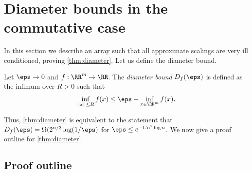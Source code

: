 



























































\setcounter{section}{2}\section{Diameter bounds in the commutative case}\label{sec:diameterComm}


In this section we describe an array such that all approximate scalings are very ill conditioned, proving \cref{thm:diameter}. Let us define the diameter bound.
\begin{dfn}\label{dfn:diameterBound} Let $\eps \to 0$ and $f:\RR^m \to \RR$. The \emph{diameter bound} $D_f(\eps)$ is defined as the infimum over $R > 0$ such that 
$$ \inf_{\|x\| \leq R} f(x) \leq \eps + \inf_{x \in \RR^m}f(x).$$
\end{dfn}
Thus, \cref{thm:diameter} is equivalent to the statement that $D_f(\eps) = \Omega(2^{n/3} \log (1/\eps)$ for $\eps \leq e^{- C n^2 \log n}$. We now give a proof outline for \cref{thm:diameter}. 

\subsection{Proof outline}\label{subsec:outline}

